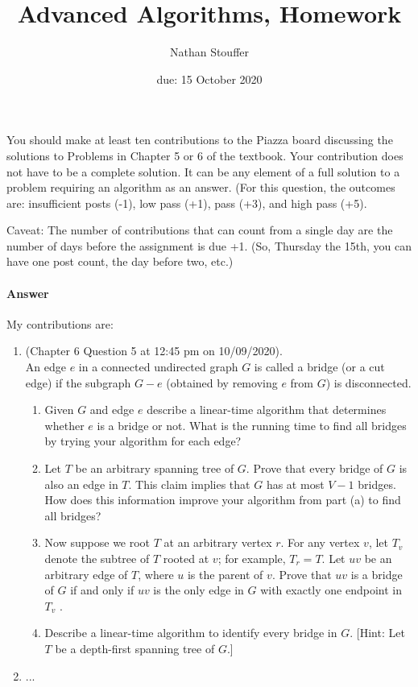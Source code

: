 \documentclass{article}
\title{Advanced Algorithms, Homework \hwnum}
\author{Nathan Stouffer}
\date{due: 15 October 2020}
\begin{document}
\maketitle

\nextprob
{}

You should make at least ten contributions to the Piazza board
discussing the solutions to Problems in Chapter 5 or 6 of the textbook.  Your
contribution does not have to be a complete solution.  It can be any element of
a full solution to a problem requiring an algorithm as an answer.  (For this
question, the outcomes are: insufficient posts (-1), low pass (+1), pass (+3),
and high pass (+5).

Caveat: The number of contributions that can count from a single day are the
number of days before the assignment is due +1.  (So, Thursday the 15th, you can
have one post count, the day before two, etc.)

\paragraph{Answer}


My contributions are:
\begin{enumerate}
    \item (Chapter 6 Question 5 at 12:45 pm on 10/09/2020). \\
        An edge $e$ in a connected undirected graph $G$ is called a bridge (or a cut edge) if the subgraph $G - e $ (obtained by removing $e$ from $G$) is disconnected.
        \begin{enumerate}[label=(\alph*)]
            \item Given $G$ and edge $e$ describe a linear-time algorithm that determines whether $e$ is a bridge or not. What is the running time to find all bridges by trying your algorithm for each edge?
            \item Let $T$ be an arbitrary spanning tree of $G$. Prove that every bridge of $G$ is also an edge in $T$. This claim implies that $G$ has at most $V-1$ bridges. How does this information improve your algorithm from part (a) to find all bridges?
            \item Now suppose we root $T$ at an arbitrary vertex $r$. For any vertex $v$, let $T_v$ denote the subtree of $T$ rooted at $v$; for example, $T_r = T$. Let $uv$ be an arbitrary edge of $T$, where $u$ is the parent of $v$. Prove that $uv$ is a bridge of $G$ if and only if $uv$ is the only edge in $G$ with exactly one endpoint in $T_v$ .
            \item Describe a linear-time algorithm to identify every bridge in $G$. [Hint: Let $T$ be a depth-first spanning tree of $G$.]
        \end{enumerate}
    \item ...
\end{enumerate}
\end{document}

